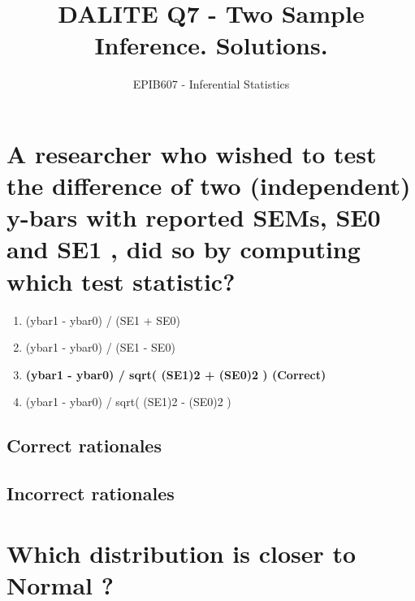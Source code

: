 \documentclass[letterpaper,9pt,twoside,printwatermark=false]{pinp}
\title{DALITE Q7 - Two Sample Inference. Solutions.}
\author[a]{EPIB607 - Inferential Statistics}
\affil[a]{Fall 2018, McGill University}
\providecommand{\tightlist}{%
  \setlength{\itemsep}{0pt}\setlength{\parskip}{0pt}}
\begin{document}
\verticaladjustment{-2pt}

\maketitle
\thispagestyle{firststyle}



\section{A researcher who wished to test the difference of two
(independent) y-bars with reported SEMs, SE0 and SE1 , did so by
computing which test
statistic?}\label{a-researcher-who-wished-to-test-the-difference-of-two-independent-y-bars-with-reported-sems-se0-and-se1-did-so-by-computing-which-test-statistic}

\begin{enumerate}
\def\labelenumi{\alph{enumi}.}
\tightlist
\item
  (ybar1 - ybar0) / (SE1 + SE0)
\item
  (ybar1 - ybar0) / (SE1 - SE0)
\item
  \textbf{(ybar1 - ybar0) / sqrt( (SE1)2 + (SE0)2 ) (Correct)}
\item
  (ybar1 - ybar0) / sqrt( (SE1)2 - (SE0)2 )
\end{enumerate}

\subsection{Correct rationales}\label{correct-rationales}

\subsection{Incorrect rationales}\label{incorrect-rationales}

\section{Which distribution is closer to Normal
?}\label{which-distribution-is-closer-to-normal}
\end{document}
